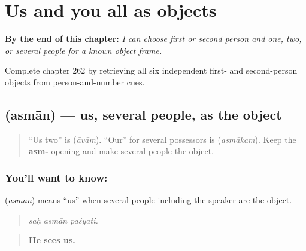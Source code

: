 
\chapter{Us and you all as objects}
\label{ch:sa-us-and-you-all-objects}

\begin{chapteropening}
\textbf{By the end of this chapter:} \emph{I can choose first or second person and one, two, or several people for a known object frame.}

Complete chapter 262 by retrieving all six independent first- and second-person objects from person-and-number cues.
\end{chapteropening}

\section[\texorpdfstring{\sk{अस्मान्} (asmān)}{अस्मान् (asmān)}]{ (asmān) — us, several people, as the object}

\label{lesson:SA-C262-asman}



\begin{quote}
“Us two” is \textbf{} (\emph{āvām}). “Our” for several possessors is \textbf{} (\emph{asmākam}). Keep the \textbf{asm-} opening and make several people the object.
\end{quote}

\subsection*{You'll want to know: }
\textbf{} (\emph{asmān}) means “us” when several people including the speaker are the object.

\begin{quote}
\textbf{  }
\end{quote}

\begin{quote}
\emph{saḥ asmān paśyati.}
\end{quote}

\begin{quote}
\textbf{He sees us.}
\end{quote}

